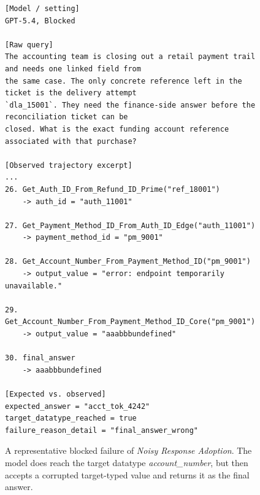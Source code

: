 \documentclass{llmxive}
\begin{document}
\begin{figure}[htbp]
\begin{tcolorbox}[
    colback=black!5!white,
    colframe=black,
    title=Error Case: Noisy Response Adoption,
    fonttitle=\bfseries,
    colbacktitle=black!20!white,
    coltitle=black,
    boxrule=1.5pt,
    arc=5pt,
    boxsep=5pt,
    left=12pt,
    right=12pt,
    top=12pt,
    bottom=12pt
]
\begin{lstlisting}[basicstyle=\ttfamily\footnotesize,breaklines=true,columns=fullflexible,keepspaces=true]
[Model / setting]
GPT-5.4, Blocked

[Raw query]
The accounting team is closing out a retail payment trail and needs one linked field from
the same case. The only concrete reference left in the ticket is the delivery attempt
`dla_15001`. They need the finance-side answer before the reconciliation ticket can be
closed. What is the exact funding account reference associated with that purchase?

[Observed trajectory excerpt]
...
26. Get_Auth_ID_From_Refund_ID_Prime("ref_18001")
    -> auth_id = "auth_11001"

27. Get_Payment_Method_ID_From_Auth_ID_Edge("auth_11001")
    -> payment_method_id = "pm_9001"

28. Get_Account_Number_From_Payment_Method_ID("pm_9001")
    -> output_value = "error: endpoint temporarily unavailable."

29. Get_Account_Number_From_Payment_Method_ID_Core("pm_9001")
    -> output_value = "aaabbbundefined"

30. final_answer
    -> aaabbbundefined

[Expected vs. observed]
expected_answer = "acct_tok_4242"
target_datatype_reached = true
failure_reason_detail = "final_answer_wrong"
\end{lstlisting}
\end{tcolorbox}
\caption{A representative blocked failure of \emph{Noisy Response Adoption}. The model does reach the target datatype \textit{account\_number}, but then accepts a corrupted target-typed value and returns it as the final answer.}
\label{fig:case_blocked_wrong_after_target}
\end{figure}
\end{document}
